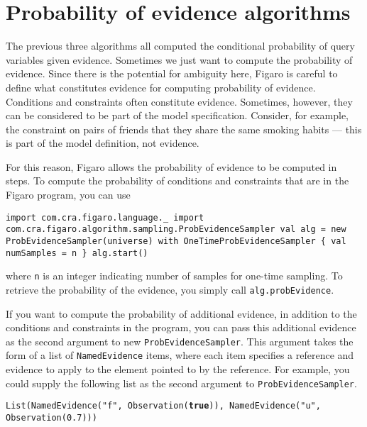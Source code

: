 \section{Probability of evidence algorithms}

The previous three algorithms all computed the conditional probability of query variables given evidence. Sometimes we just want to compute the probability of evidence. Since there is the potential for ambiguity here, Figaro is careful to define what constitutes evidence for computing probability of evidence. Conditions and constraints often constitute evidence. Sometimes, however, they can be considered to be part of the model specification. Consider, for example, the constraint on pairs of friends that they share the same smoking habits — this is part of the model definition, not evidence.

For this reason, Figaro allows the probability of evidence to be computed in steps. To compute the probability of conditions and constraints that are in the Figaro program, you can use

\begin{flushleft}
\texttt{import com.cra.figaro.language.\_
\newline \tab import com.cra.figaro.algorithm.sampling.ProbEvidenceSampler
\newline 
\newline val alg = new ProbEvidenceSampler(universe) with
\newline \tab OneTimeProbEvidenceSampler \{ val numSamples = n \}
\newline alg.start()
}
\end{flushleft}

where \texttt{n} is an integer indicating number of samples for one-time sampling. To retrieve the probability of the evidence, you simply call \texttt{alg.probEvidence}.

If you want to compute the probability of additional evidence, in addition to the conditions and constraints in the program, you can pass this additional evidence as the second argument to new \texttt{ProbEvid\-enceSampler}. This argument takes the form of a list of \texttt{NamedEvidence} items, where each item specifies a reference and evidence to apply to the element pointed to by the reference. For example, you could supply the following list as the second argument to \texttt{ProbEvidenceSampler}.

\begin{flushleft}
\texttt{List(NamedEvidence("f", Observation(\textbf{true})), 
\newline NamedEvidence("u", Observation(0.7))) }
\end{flushleft}

